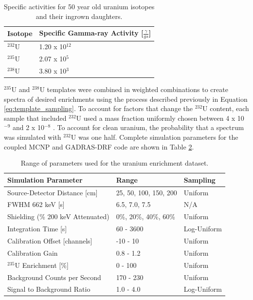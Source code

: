 \begin{table}[H]
\centering
\caption{Specific activities for 50 year old uranium isotopes and their ingrown daughters.}
\label{table:specific_activities_radsrc}
\begin{tabular}{ll}
\hline
\textbf{Isotope} & \textbf{Specific Gamma-ray Activity [$\frac{\gamma}{g s}$]} \\ \hline
$^{232}$U & 1.20 x 10$^{12}$ \\ 
$^{235}$U & 2.07 x 10$^{5}$ \\
$^{238}$U & 3.80 x 10$^{3}$ \\ \hline
\end{tabular}
\end{table}

$^{235}$U and $^{238}$U templates were combined in weighted combinations to create spectra of desired enrichments using the process described previously in Equation \ref{eq:template_sampling}. To account for factors that change the $^{232}$U content, each sample that included $^{232}$U used a mass fraction uniformly chosen between 4 x 10$^{-9}$ and 2 x 10$^{-8}$ \cite{Peurrung2019}. To account for clean uranium, the probability that a spectrum was simulated with $^{232}$U was one half. Complete simulation parameters for the coupled MCNP and GADRAS-DRF code are shown in Table \ref{table:hyperparameter_dataset_full_parameters_enrichment}.

\begin{table}[H]
\centering
\caption{Range of parameters used for the uranium enrichment dataset.}
\label{table:hyperparameter_dataset_full_parameters_enrichment}
\begin{tabular}{lll}
\hline
\textbf{Simulation Parameter} & \textbf{Range} & \textbf{Sampling} \\ \hline
Source-Detector Distance [cm] & 25, 50, 100, 150, 200 & Uniform \\ %
FWHM 662 keV [s] & 6.5, 7.0, 7.5 & N/A \\ %
Shielding (\% 200 keV Attenuated) & 0\%, 20\%, 40\%, 60\% & Uniform \\ %
Integration Time [s] & 60 - 3600 & Log-Uniform \\ %
Calibration Offset [channels] & -10 - 10 & Uniform \\ %
Calibration Gain & 0.8 - 1.2 & Uniform \\ %
$^{235}$U Enrichment [\%] & 0 - 100 & Uniform \\ %
Background Counts per Second & 170 - 230 & Uniform \\ %
Signal to Background Ratio & 1.0 - 4.0 & Log-Uniform \\ \hline
\end{tabular}
\end{table}


